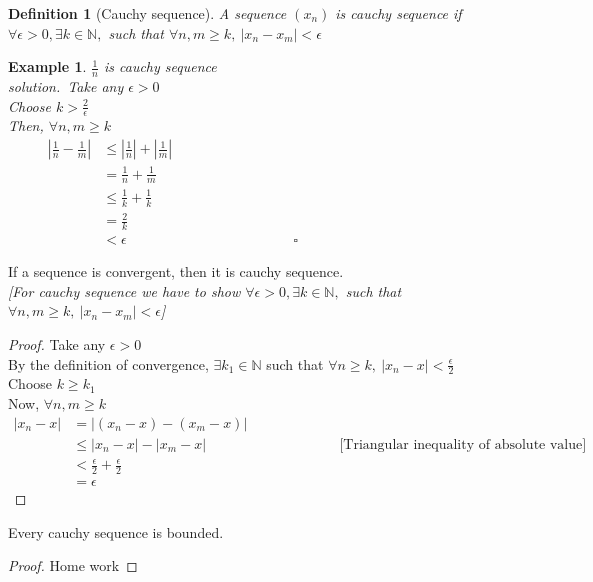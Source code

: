 \documentclass{article}
\newtheorem{definition}{Definition}[section]
\newtheorem{example}{Example}[section]
\newcommand{\hs}{\hspace}
\begin{document}
\begin{definition}[Cauchy sequence]
    A sequence $(x_n)$ is cauchy sequence if $\forall \epsilon > 0, \exists k \in \mathbb{N},$ such that $\forall n,m \geq k,\ |x_n -x_m|< \epsilon$
\end{definition}
\begin{example}
    $\frac{1}{n}$ is cauchy sequence\\
    solution.\ Take any $\epsilon > 0$\\
    Choose $\displaystyle k>\frac{2}{\epsilon}$\\
    Then, $\forall n,m \geq k$
    \begin{align*}
        |\frac{1}{n}-\frac{1}{m}|&\leq |\frac{1}{n}|+|\frac{1}{m}|\hs{9cm}\\
        &= \frac{1}{n}+\frac{1}{m}\\
        &\leq \frac{1}{k}+\frac{1}{k}\\
        &= \frac{2}{k}\\
        &<{\epsilon}\hspace{5cm} \square
    \end{align*}
\end{example}
\begin{theorem}{}{}
    If a sequence is convergent, then it is cauchy sequence.\\
    \textit{[For cauchy sequence we have to show $\forall \epsilon > 0, \exists k \in \mathbb{N},$ such that $\forall n,m \geq k,\ |x_n -x_m|< \epsilon$]}\begin{proof}
        Take any $\epsilon >0$\\
        By the definition of convergence, $\exists k_1 \in \mathbb{N}$ such that $\forall n \geq k,\ |x_n -x|< \displaystyle \frac{\epsilon}{2}$\\
        Choose $k\geq k_1$\\
        Now, $\forall n,m \geq k $
        \begin{align*}
            |x_n -x|&= |(x_n -x)-(x_m -x)|\\
            &\leq |x_n -x|-|x_m -x| \hs{4cm}\text{[Triangular inequality of absolute value]}\\
            &< \frac{\epsilon}{2}+ \frac{\epsilon}{2}\\
            &= \epsilon
        \end{align*}
    \end{proof}
\end{theorem}
\begin{theorem}{}{}
    Every cauchy sequence is bounded.
    \begin{proof}
        Home work
    \end{proof}
\end{theorem}
\end{document}

